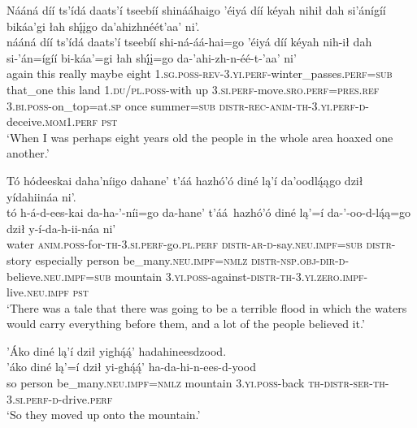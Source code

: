 \ea\label{ex:text6-11-2}
Nááná díí ts’ídá daats’í tseebíí shinááhaigo ’éiyá díí kéyah nihił dah si’ánígíí bikáa’gi łah shį́įgo da’ahizhnéét’aa’ ni’.\\
\gll nááná	díí	ts’ídá	daats’í	tseebíí	shi-ná-áá-hai=go	’éiyá	díí	kéyah	nih-ił	dah	si-’án=ígíí	bi-káa’=gi	łah	shį́į=go	da-’ahi-zh-n-éé-t-’aa’	ni’\\
     again	this	really	maybe	eight	1.\textsc{sg}.\textsc{poss}-\textsc{rev}-3.\textsc{yi}.\textsc{perf}-winter\_passes.\textsc{perf}=\textsc{sub}	that\_one	this	land	1.\textsc{du}/\textsc{pl}.\textsc{poss}-with	up	3.\textsc{si}.\textsc{perf}-move.\textsc{sro}.\textsc{perf}=\textsc{pres}.\textsc{ref}	3.\textsc{bi}.\textsc{poss}-on\_top=at.\textsc{sp}	once	summer=\textsc{sub}	\textsc{distr}-\textsc{rec}-\textsc{anim}-\textsc{th}-3.\textsc{yi}.\textsc{perf}-\textsc{d}-deceive.\textsc{mom}1.\textsc{perf}	\textsc{pst}\\
\glt `When I was perhaps eight years old the people in the whole area hoaxed one another.'
\z

\newpage
\ea\label{ex:text6-11-3}
Tó hódeeskai daha’níigo dahane’ t’áá hazhó’ó diné lą’í da’oodlą́ągo dził yídahiináa ni’.\\
\gll tó	h-á-d-ees-kai	da-ha-’-níi=go	da-hane’	t’áá~{hazhó’ó}	diné	lą’=í	da-’-oo-d-lą́ą=go	dził	y-í-da-h-ii-náa	ni’\\
     water	\textsc{anim}.\textsc{poss}-for-\textsc{th}-3.\textsc{si}.\textsc{perf}-go.\textsc{pl}.\textsc{perf}	\textsc{distr}-\textsc{ar}-\textsc{d}-say.\textsc{neu}.\textsc{impf}=\textsc{sub}	\textsc{distr}-story	especially	person	be\_many.\textsc{neu}.\textsc{impf}=\textsc{nmlz}	\textsc{distr}-\textsc{nsp}.\textsc{obj}-\textsc{dir}-\textsc{d}-believe.\textsc{neu}.\textsc{impf}=\textsc{sub}	mountain	3.\textsc{yi}.\textsc{poss}-against-\textsc{distr}-\textsc{th}-3.\textsc{yi}.\textsc{zero}.\textsc{impf}-live.\textsc{neu}.\textsc{impf}	\textsc{pst}\\
\glt `There was a tale that there was going to be a terrible flood in which the waters would carry everything before them, and a lot of the people believed it.'
\z

\ea\label{ex:text6-11-4}
’Áko diné lą’í dził yighą́ą́’ hadahineesdzood.\\
\gll ’áko	diné	lą’=í	dził	yi-ghą́ą́’	ha-da-hi-n-ees-d-yood\\
     so	person	be\_many.\textsc{neu}.\textsc{impf}=\textsc{nmlz}	mountain	3.\textsc{yi}.\textsc{poss}-back	\textsc{th}-\textsc{distr}-\textsc{ser}-\textsc{th}-3.\textsc{si}.\textsc{perf}-\textsc{d}-drive.\textsc{perf}\\
\glt `So they moved up onto the mountain.'
\z

